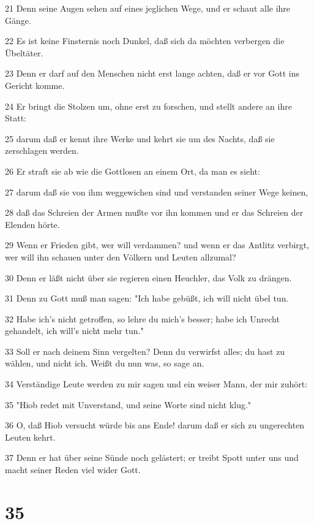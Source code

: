\par 21 Denn seine Augen sehen auf eines jeglichen Wege, und er schaut alle ihre Gänge.
\par 22 Es ist keine Finsternis noch Dunkel, daß sich da möchten verbergen die Übeltäter.
\par 23 Denn er darf auf den Menschen nicht erst lange achten, daß er vor Gott ins Gericht komme.
\par 24 Er bringt die Stolzen um, ohne erst zu forschen, und stellt andere an ihre Statt:
\par 25 darum daß er kennt ihre Werke und kehrt sie um des Nachts, daß sie zerschlagen werden.
\par 26 Er straft sie ab wie die Gottlosen an einem Ort, da man es sieht:
\par 27 darum daß sie von ihm weggewichen sind und verstanden seiner Wege keinen,
\par 28 daß das Schreien der Armen mußte vor ihn kommen und er das Schreien der Elenden hörte.
\par 29 Wenn er Frieden gibt, wer will verdammen? und wenn er das Antlitz verbirgt, wer will ihn schauen unter den Völkern und Leuten allzumal?
\par 30 Denn er läßt nicht über sie regieren einen Heuchler, das Volk zu drängen.
\par 31 Denn zu Gott muß man sagen: "Ich habe gebüßt, ich will nicht übel tun.
\par 32 Habe ich's nicht getroffen, so lehre du mich's besser; habe ich Unrecht gehandelt, ich will's nicht mehr tun."
\par 33 Soll er nach deinem Sinn vergelten? Denn du verwirfst alles; du hast zu wählen, und nicht ich. Weißt du nun was, so sage an.
\par 34 Verständige Leute werden zu mir sagen und ein weiser Mann, der mir zuhört:
\par 35 "Hiob redet mit Unverstand, und seine Worte sind nicht klug."
\par 36 O, daß Hiob versucht würde bis ans Ende! darum daß er sich zu ungerechten Leuten kehrt.
\par 37 Denn er hat über seine Sünde noch gelästert; er treibt Spott unter uns und macht seiner Reden viel wider Gott.

\chapter{35}

